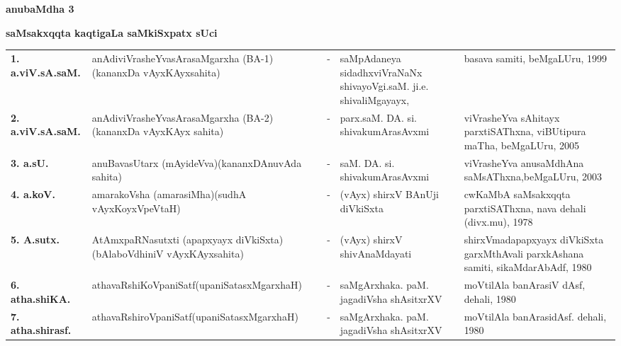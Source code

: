 \begin{center}
{\Huge\bfseries anubaMdha 3}

\vskip 1cm

{\large\bf saMsakxqqta kaqtigaLa saMkiSxpatx sUci}
\end{center}

{\renewcommand{\arraystretch}{1.3}
\begin{longtable}{lp{5cm}cp{5cm}<{\raggedright}p{3cm}<{\raggedright}@{}}
\endfirsthead
\endhead
\endfoot
\endlastfoot
{\bf 1. a.viV.sA.saM.} &  anAdiviVrasheYvasArasaMgarxha (BA-1) (kananxDa vAyxKAyxsahita) &-& saMpAdaneya sidadhxviVraNaNx shivayoVgi.\newline saM. ji.e. shivaliMgayayx, & basava samiti, beMgaLUru, 1999\\
{\bf 2. a.viV.sA.saM.} & anAdiviVrasheYvasArasaMgarxha (BA-2) (kananxDa vAyxKAyx sahita) &-& parx.saM. DA. si. shivakumArasAvxmi & viVrasheYva sAhitayx parxtiSAThxna, viBUtipura maTha, beMgaLUru, 2005\\
{\bf 3. a.sU.} & anuBavasUtarx (mAyideVva)\newline (kananxDAnuvAda sahita) &-& saM. DA. si. shivakumArasAvxmi & viVrasheYva anusaMdhAna saMsAThxna,\newline beMgaLUru, 2003\\
{\bf 4. a.koV.} &  amarakoVsha (amarasiMha)\newline (sudhA vAyxKoyxVpeVtaH) &-& (vAyx) shirxV BAnUji diVkiSxta & cwKaMbA saMsakxqqta parxtiSAThxna, nava dehali (divx.mu), 1978\\
{\bf 5. A.sutx.} & AtAmxpaRNasutxti (apapxyayx diVkiSxta)\newline (bAlaboVdhiniV vAyxKAyxsahita) &-& (vAyx) shirxV shivAnaMdayati & shirxVmadapapxyayx diVkiSxta garxMthAvali parxkAshana samiti, sikaMdarAbAdf, 1980\\
{\bf 6. atha.shiKA.} & athavaRshiKoVpaniSatf\newline (upaniSatasxMgarxhaH) &-& saMgArxhaka. paM. jagadiVsha shAsitxrXV & moVtilAla banArasiV dAsf, dehali, 1980\\
{\bf 7. atha.shirasf.} & athavaRshiroVpaniSatf\newline (upaniSatasxMgarxhaH) &-& saMgArxhaka. paM. jagadiVsha shAsitxrXV & moVtilAla banArasidAsf. dehali, 1980\\

\end{longtable}}
